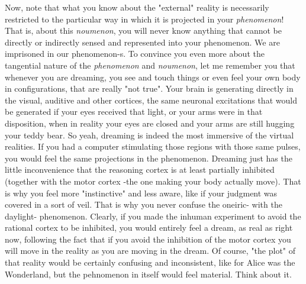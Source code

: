 \documentclass[11pt, a4paper]{article} %
\begin{document}
Now, note that what you know about the "external" reality is necessarily restricted to the particular way in which it is projected in your {\em phenomenon}! That is, about this {\em noumenon}, you will never know anything that cannot be directly or indirectly sensed and represented into your phenomenon. We are imprisoned in our phenomenon-s. To convince you even more about the tangential nature of the {\em phenomenon} and {\em noumenon}, let me remember you that whenever you are dreaming, you see and touch things or even feel your own body in configurations, that are really "not true". Your brain is generating directly in the visual, auditive and other cortices, the same neuronal excitations that would be generated if your eyes received that light, or your arms were in that disposition, when in reality your eyes are closed and your arms are still hugging your teddy bear. So yeah, dreaming is indeed the most immersive of the virtual realities. If you had a computer stimulating those regions with those same pulses, you would feel the same projections in the phenomenon. Dreaming just has the little inconvenience that the reasoning cortex is at least partially inhibited (together with the motor cortex -the one making your body actually move). That is why you feel more "instinctive" and less aware, like if your judgment was covered in a sort of veil. That is why you never confuse the oneiric- with the daylight- phenomenon. Clearly, if you made the inhuman experiment to avoid the rational cortex to be inhibited, you would entirely feel a dream, as real as right now, following the fact that if you avoid the inhibition of the motor cortex you will move in the reality as you are moving in the dream. Of course, "the plot"  of that reality would be certainly confusing and inconsistent, like for Alice was the Wonderland, but the pehnomenon in itself would feel material. Think about it.\vspace{0.3cm}
\end{document}

